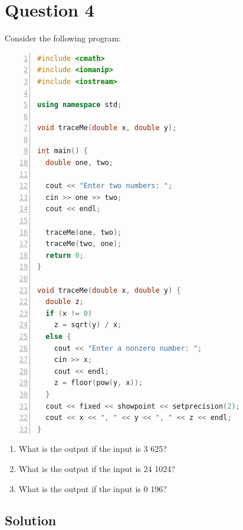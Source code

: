 \documentclass[a4paper, 10pt]{article}
\begin{document}
  \section{Question 4}
    Consider the following program:

    \begin{lstlisting}[language=c++,numbers=left]
#include <cmath>
#include <iomanip>
#include <iostream>

using namespace std;

void traceMe(double x, double y);

int main() {
  double one, two;

  cout << "Enter two numbers: ";
  cin >> one >> two;
  cout << endl;

  traceMe(one, two);
  traceMe(two, one);
  return 0;
}

void traceMe(double x, double y) {
  double z;
  if (x != 0)
    z = sqrt(y) / x;
  else {
    cout << "Enter a nonzero number: ";
    cin >> x;
    cout << endl;
    z = floor(pow(y, x));
  }
  cout << fixed << showpoint << setprecision(2);
  cout << x << ", " << y << ", " << z << endl;
}
    \end{lstlisting}

    \begin{enumerate}[label=\Alph*.]
      \item What is the output if the input is 3 625?
      \item What is the output if the input is 24 1024?
      \item What is the output if the input is 0 196?
    \end{enumerate}
    \subsection{Solution}
      \begin{table}[H]
      \end{table}
\end{document}

